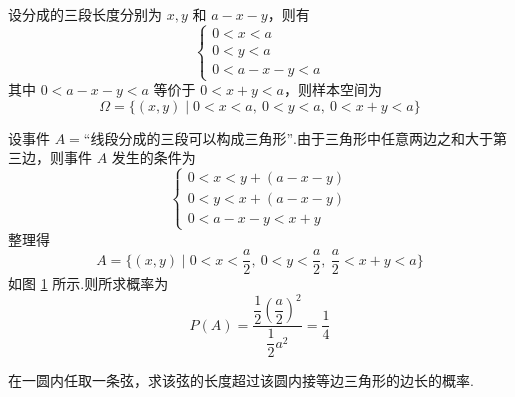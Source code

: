 \begin{solution}
    设分成的三段长度分别为 $x, y$ 和 $a-x-y$，则有
    $$
    \begin{cases}
        0<x<a \\
        0<y<a \\
        0 < a-x-y < a
    \end{cases}
    $$
    其中 $0 < a-x-y < a$ 等价于 $0 < x+y < a$，则样本空间为
    $$
    \varOmega = \{ (x,y) \mid 0<x<a,\ 0<y<a,\ 0 < x+y < a \}
    $$

    设事件 $A = \text{“线段分成的三段可以构成三角形”}$.由于三角形中任意两边之和大于第三边，则事件 $A$ 发生的条件为
    $$
    \begin{cases}
        0 < x < y + (a-x-y) \\
        0 < y < x + (a-x-y) \\
        0 < a-x-y < x+y
    \end{cases}
    $$
    整理得
    $$
    A = \{ (x,y) \mid 0 < x < \dfrac{a}{2},\ 0 < y < \dfrac{a}{2},\ \dfrac{a}{2} < x+y < a \}
    $$
    如图 \ref{fig:example-三角形} 所示.则所求概率为
    $$
    P(A) = \dfrac{\dfrac{1}{2} \left( \dfrac{a}{2} \right)^2}{\dfrac{1}{2} a^2} = \dfrac{1}{4}
    $$

    \begin{figure}[H]
        \centering

        
        \caption{}
        \label{fig:example-三角形}
    \end{figure}
\end{solution}

\begin{example}[][贝特朗奇论]
    \indent 在一圆内任取一条弦，求该弦的长度超过该圆内接等边三角形的边长的概率.
\end{example}

